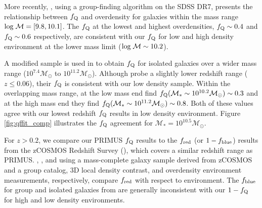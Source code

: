 \documentclass{emulateapj}
\begin{document}
More recently, \cite{Tinker:2011aa}, using a group-finding algorithm on the SDSS DR7, presents the relationship between $f_{\rm{Q}}$ and overdensity for galaxies within the mass range $\rm{log} \; \mathcal{M} = [9.8, 10.1]$. The \cite{Tinker:2011aa} $f_{\rm{Q}}$ at the lowest and highest overdensities, $f_{\rm{Q}} \sim 0.4$ and $f_{\rm{Q}} \sim 0.6$ respectively, are consistent with our $f_{\rm{Q}}$ for low and high density environment at the lower mass limit ($\rm{log} \; \mathcal{M} \sim 10.2$). 

A modified \cite{Tinker:2011aa} sample is used in \cite{geha12a} to
obtain $f_{\rm{Q}}$ for isolated galaxies over a wider mass range
($10^{7.4} \mathcal{M}_\odot$ to $10^{11.2}
\mathcal{M}_{\odot}$). Although \cite{geha12a} probe a slightly lower
redshift range ($ z \le 0.06$), their $f_{\rm{Q}}$ is consistent with
our low density sample. Within the overlapping mass range, at the low
mass end \cite{geha12a} find $f_{\rm{Q}}(\mathcal{M}_{*} \sim
10^{10.2} \mathcal{M}_{\odot}) \sim 0.3$ and at the high mass end they
find $f_{\rm{Q}}(\mathcal{M}_{*} \sim 10^{11.2} \mathcal{M}_{\odot})
\sim 0.8$. Both of these values agree with our lowest redshift
$f_{\rm{Q}}$ results in low density environment. Figure
\ref{fig:qffit_comp} illustrates the $f_{\rm{Q}}$ agreement for
$\mathcal{M}_{*} = 10^{10.5} \mathcal{M}_{\odot}$.


For $z > 0.2$, we compare our PRIMUS $f_{\rm{Q}}$ results to the $f_{\rm{red}}$ (or $1-f_{\rm{blue}}$) results from the zCOSMOS Redshift Survey (\citealt{Iovino:2010aa, Cucciati:2010aa, Kovac:2014aa}), which covers a similar redshift range as PRIMUS. \cite{Iovino:2010aa}, \cite{Cucciati:2010aa}, and \cite{Kovac:2014aa} using a mass-complete galaxy sample derived from zCOSMOS and a group catalog, 3D local density contrast, and overdensity environment measurements, respectively, compare $f_{\rm{red}}$ with respect to environment. The $f_{\rm{blue}}$ for group and isolated galaxies from \cite{Iovino:2010aa} are generally inconsistent with our $1-f_{\rm{Q}}$ for high and low density environments. 
\end{document}
